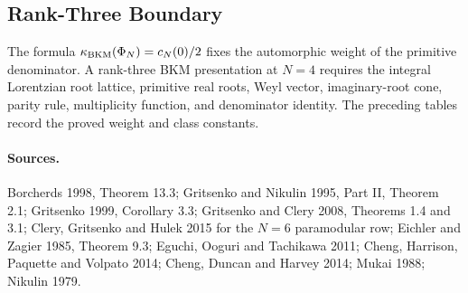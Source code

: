 \subsection*{Rank-Three Boundary}

The formula \(\kappa_{\mathrm{BKM}}(\Phi_N)=c_N(0)/2\) fixes the automorphic weight of
the primitive denominator.  A rank-three BKM presentation at \(N=4\)
requires the integral Lorentzian root lattice, primitive real roots,
Weyl vector, imaginary-root cone, parity rule, multiplicity function,
and denominator identity.  The preceding tables record the proved
weight and class constants.

\paragraph{Sources.}
Borcherds 1998, Theorem 13.3; Gritsenko and Nikulin 1995, Part II,
Theorem 2.1; Gritsenko 1999, Corollary 3.3; Gritsenko and Clery 2008,
Theorems 1.4 and 3.1; Clery, Gritsenko and Hulek 2015 for the \(N=6\)
paramodular row; Eichler and Zagier 1985, Theorem 9.3; Eguchi, Ooguri
and Tachikawa 2011; Cheng, Harrison, Paquette and Volpato 2014;
Cheng, Duncan and Harvey 2014; Mukai 1988; Nikulin 1979.
